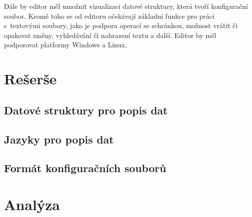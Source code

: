 \documentclass[FM,DP]{tulthesis}
\begin{document}
Dále by editor měl umožnit vizualizaci datové struktury, která tvoří konfigurační soubor. Kromě toho se od editoru očekávají základní funkce pro práci s~textovými soubory, jako je podpora operací se schránkou, možnost vrátit či opakovat změny, vyhledávání či nahrazení textu a další. Editor by měl podporovat platformy Windows a Linux.



\chapter{Rešerše}





\section{Datové struktury pro popis dat}



\section{Jazyky pro popis dat}

\section{Formát konfiguračních souborů}


\chapter{Analýza}
\end{document}
